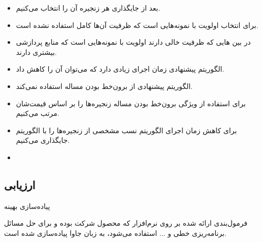 \documentclass{beamer}
\makeatletter
\newcommand{\RTList}{\raggedleft\rightskip\@totalleftmargin}
\makeatother
\begin{document}
\begin{persian}
\begin{frame}{}
\begin{itemize}
        \item بعد از جایگذاری هر زنجیره  آن را انتخاب می‌کنیم.
        \item برای انتخاب  اولویت با نمونه‌هایی است که ظرفیت آن‌ها کامل استفاده نشده است.
        \item در بین هایی که ظرفیت خالی دارند اولویت با نمونه‌هایی است که منابع پردازشی بیشتری دارند.
    \end{itemize}
\end{frame}
\begin{frame}{}
    \begin{itemize}\RTList{}
        \justifying
        \item الگوریتم پیشنهادی  زمان اجرای زیادی دارد که می‌توان آن را کاهش داد.
        \item الگوریتم پیشنهادی  از برون‌خط بودن مساله استفاده نمی‌کند.
        \item برای استفاده از ویژگی برون‌خط بودن مساله زنجیره‌ها را بر اساس قیمت‌شان مرتب می‌کنیم.
        \item برای کاهش زمان اجرای الگوریتم نسب مشخصی از زنجیره‌ها را با الگوریتم  جایگذاری می‌کنیم.
        \item {}
    \end{itemize}
\end{frame}
\begin{frame}{}
    \section{ارزیابی}
\end{frame}
\begin{frame}{پیاده‌سازی بهینه}
    \par
    فرمول‌بندی ارائه شده بر روی نرم‌افزار
    که محصول شرکت  بوده و برای حل مسائل برنامه‌ریزی خطی و ...
    استفاده می‌شود،
    به زبان جاوا پیاده‌سازی شده است.


\end{frame}
\end{persian}
\end{document}
